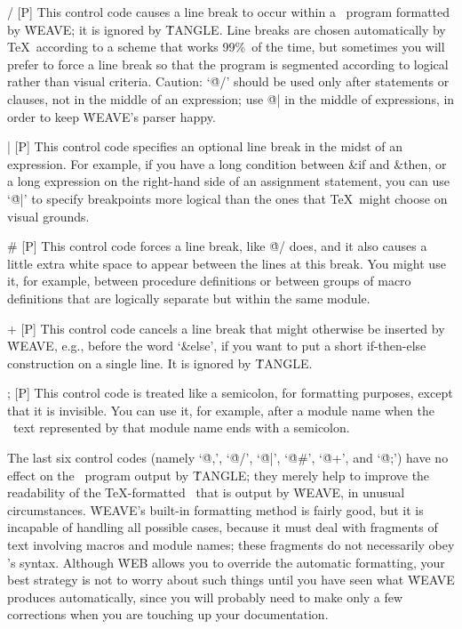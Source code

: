 \@/ [P] This control code causes a line break to occur within a \PASCAL\
program formatted by \.{WEAVE}; it is ignored by \.{TANGLE}. Line breaks
are chosen automatically by \TeX\ according to a scheme that works 99\%\
of the time, but sometimes you will prefer to force a line break so that
the program is segmented according to logical rather than visual criteria.
Caution: `\.{@/}' should be used only after statements or clauses, not in
the middle of an expression; use \.{@|} in the middle of expressions, in
order to keep \.{WEAVE}'s parser happy.

\@| [P] This control code specifies an optional line break in the midst of
an expression. For example, if you have a long condition between \&{if} and
\&{then}, or a long expression on the right-hand side of an assignment
statement, you can use `\.{@|}' to specify breakpoints more logical than
the ones that \TeX\ might choose on visual grounds.

\@\# [P] This control code forces a line break, like \.{@/} does,
and it also causes a little extra white space to appear between the lines at
this break. You might use it, for example, between procedure definitions or
between groups of macro definitions that are logically separate but within
the same module.

\@+ [P] This control code cancels a line break that might otherwise be
inserted by \.{WEAVE}, e.g., before the word `\&{else}', if you want to
put a short if-then-else construction on a single line. It is ignored by
\.{TANGLE}.

\@; [P] This control code is treated like a semicolon, for formatting
purposes, except that it is invisible. You can use it, for example, after
a module name when the \PASCAL\ text represented by that module name ends
with a semicolon.

\yskip\noindent
The last six control codes (namely `\.{@,}', `\.{@/}', `\.{@|}',
`\.{@\#}', `\.{@+}', and `\.{@;}') have no effect on the \PASCAL\
program output by \.{TANGLE}; they merely help to improve the readability
of the \TeX-formatted \PASCAL\ that is output by \.{WEAVE}, in unusual
circumstances. \.{WEAVE}'s built-in formatting method is fairly good, but
it is incapable of handling all possible cases, because it must deal with
fragments of text involving macros and module names; these fragments do
not necessarily obey \PASCAL's syntax. Although \.{WEB} allows you to
override the automatic formatting, your best strategy is not to worry
about such things until you have seen what \.{WEAVE} produces automatically,
since you will probably need to make only a few corrections when you are
touching up your documentation.

